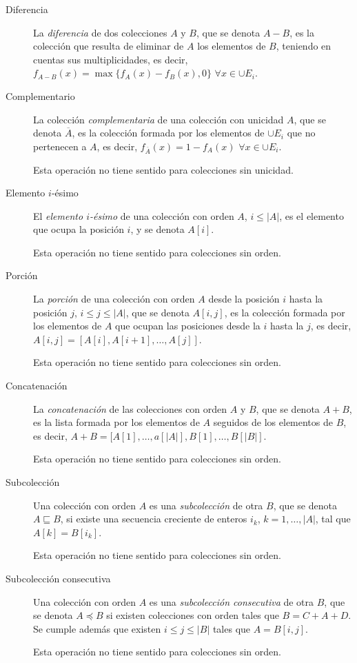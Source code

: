 \documentclass[a4paper,10pt,twoside]{article}
\theoremstyle{definition}
\begin{document}
\begin{description}
\item[Diferencia] La \emph{diferencia} de dos colecciones $A$ y $B$, que se denota $A-B$, es la colección que resulta de eliminar de $A$ los elementos de $B$, teniendo en cuentas sus multiplicidades, es decir,
$f_{A-B}(x)=\max\{f_A(x)-f_B(x),0\}$ $\forall x\in \cup E_i$.

\item[Complementario] La colección \emph{complementaria} de una colección con unicidad $A$, que se denota $\overline A$, es la colección formada por los elementos de $\cup E_i$ que no pertenecen a $A$, es decir, $f_{\overline A}(x)=1-f_A(x)$ $\forall x\in \cup E_i$.

Esta operación no tiene sentido para colecciones sin unicidad.

\item[Elemento $i$-ésimo] El \emph{elemento $i$-ésimo} de una colección con orden $A$, $i\leq |A|$, es el elemento que ocupa la posición $i$, y se denota $A[i]$.

Esta operación no tiene sentido para colecciones sin orden.

\item[Porción] La \emph{porción} de una colección con orden $A$ desde la posición $i$ hasta la posición $j$, $i\leq j\leq |A|$, que se denota $A[i,j]$, es la colección formada por los elementos de $A$ que ocupan las posiciones desde la $i$ hasta la $j$, es decir, $A[i,j]=[A[i],A[i+1],\ldots,A[j]]$.

Esta operación no tiene sentido para colecciones sin orden. 

\item[Concatenación] La \emph{concatenación} de las colecciones con orden $A$ y $B$, que se denota $A+B$, es la lista formada por los elementos de $A$ seguidos de los elementos de $B$, es decir, $A+B=[A[1],\ldots,a[|A|],B[1],\ldots,B[|B|]$.

Esta operación no tiene sentido para colecciones sin orden.

\item[Subcolección] Una colección con orden $A$ es una \emph{subcolección} de otra $B$, que se denota $A\sqsubseteq B$, si existe una secuencia creciente de enteros $i_k$, $k=1,\ldots,|A|$, tal que $A[k]=B[i_k]$.

Esta operación no tiene sentido para colecciones sin orden.

\item[Subcolección consecutiva] Una colección con orden $A$ es una \emph{subcolección consecutiva} de otra $B$, que se denota $A\preceq B$ si existen colecciones con orden tales que $B=C+A+D$.
Se cumple además que existen $i\leq j\leq |B|$ tales que $A=B[i,j]$.

Esta operación no tiene sentido para colecciones sin orden.
\end{description}
\end{document}
